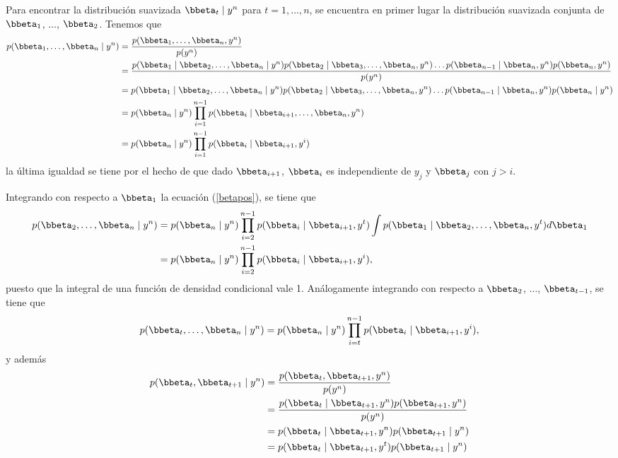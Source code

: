 Para encontrar la distribución suavizada $\bbeta_t \mid y^n$ para $t=1,\ldots,n$, se encuentra en primer lugar la distribución suavizada conjunta de $\bbeta_1$, $\ldots$, $\bbeta_2$. Tenemos que
\begin{align}\label{betapos}
p(\bbeta_1,\ldots,\bbeta_n \mid y^n)&=\frac{p(\bbeta_1,\ldots,\bbeta_n,y^n)}{p(y^n)}\notag\\
&=\frac{p(\bbeta_1 \mid \bbeta_2,\ldots,\bbeta_n \mid y^n)p(\bbeta_2 \mid \bbeta_3,\ldots,\bbeta_n,y^n)\ldots p(\bbeta_{n-1} \mid \bbeta_n,y^n)p(\bbeta_n,y^n)}{p(y^n)}\notag\\
&=p(\bbeta_1 \mid \bbeta_2,\ldots,\bbeta_n \mid y^n)p(\bbeta_2 \mid \bbeta_3,\ldots,\bbeta_n,y^n)\ldots p(\bbeta_{n-1} \mid \bbeta_n,y^n)p(\bbeta_n \mid y^n)\notag\\
&=p(\bbeta_n \mid y^n)\prod_{i=1}^{n-1}p(\bbeta_i \mid \bbeta_{i+1},\ldots,\bbeta_n,y^n)\notag\\
&=p(\bbeta_n \mid y^n)\prod_{i=1}^{n-1}p(\bbeta_i \mid \bbeta_{i+1},y^i)
\end{align}
la última igualdad se tiene por el hecho de que dado $\bbeta_{i+1}$, $\bbeta_i$ es independiente de $y_j$ y $\bbeta_j$ con $j>i$.

Integrando con respecto a $\bbeta_1$ la ecuación (\ref{betapos}), se tiene que
\begin{align*}
p(\bbeta_2,\ldots,\bbeta_n \mid y^n)&=p(\bbeta_n \mid y^n)\prod_{i=2}^{n-1}p(\bbeta_i \mid \bbeta_{i+1},y^t)\int p(\bbeta_1 \mid \bbeta_2,\ldots,\bbeta_n,y^t)d\bbeta_1\\
&=p(\bbeta_n \mid y^n)\prod_{i=2}^{n-1}p(\bbeta_i \mid \bbeta_{i+1},y^i),
\end{align*}
puesto que la integral de una función de densidad condicional vale 1. Análogamente integrando con respecto a $\bbeta_2$, $\ldots$, $\bbeta_{t-1}$, se tiene que
\begin{equation*}
p(\bbeta_t,\ldots,\bbeta_n \mid y^n)=p(\bbeta_n \mid y^n)\prod_{i=t}^{n-1}p(\bbeta_i \mid \bbeta_{i+1},y^i),
\end{equation*}
y además
\begin{align*}
p(\bbeta_t,\bbeta_{t+1} \mid y^n)&=\frac{p(\bbeta_t,\bbeta_{t+1},y^n)}{p(y^n)}\\
&=\frac{p(\bbeta_t \mid \bbeta_{t+1},y^n)p(\bbeta_{t+1},y^n)}{p(y^n)}\\
&=p(\bbeta_t \mid \bbeta_{t+1},y^n)p(\bbeta_{t+1} \mid y^n)\\
&=p(\bbeta_t \mid \bbeta_{t+1},y^t)p(\bbeta_{t+1} \mid y^n)
\end{align*}


